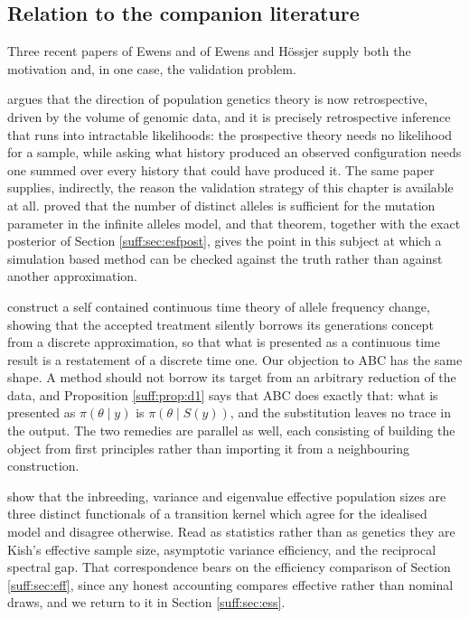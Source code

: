 \subsection{Relation to the companion literature}

Three recent papers of Ewens and of Ewens and H\"ossjer supply both the motivation and, in one
case, the validation problem.

\citet{suff:ewens2024} argues that the direction of population genetics theory is now
retrospective, driven by the volume of genomic data, and it is precisely retrospective
inference that runs into intractable likelihoods: the prospective theory needs no likelihood
for a sample, while asking what history produced an observed configuration needs one summed
over every history that could have produced it. The same paper supplies, indirectly, the
reason the validation strategy of this chapter is available at all. \citet{suff:ewens1972}
proved that the number of distinct alleles is sufficient for the mutation parameter in the
infinite alleles model, and that theorem, together with the exact posterior of Section
\ref{suff:sec:esfpost}, gives the point in this subject at which a simulation based method
can be checked against the truth rather than against another approximation.

\citet{suff:hossjerewens2025} construct a self contained continuous time theory of allele
frequency change, showing that the accepted treatment silently borrows its generations concept
from a discrete approximation, so that what is presented as a continuous time result is a
restatement of a discrete time one. Our objection to ABC has the same shape. A method should
not borrow its target from an arbitrary reduction of the data, and Proposition
\ref{suff:prop:d1} says that ABC does exactly that: what is presented as $\pi(\theta\mid y)$
is $\pi(\theta\mid S(y))$, and the substitution leaves no trace in the output. The two
remedies are parallel as well, each consisting of building the object from first principles
rather than importing it from a neighbouring construction.

\citet{suff:ewenshossjer2025} show that the inbreeding, variance and eigenvalue effective
population sizes are three distinct functionals of a transition kernel which agree for the
idealised model and disagree otherwise. Read as statistics rather than as genetics they are
Kish's effective sample size, asymptotic variance efficiency, and the reciprocal spectral
gap. That correspondence bears on the efficiency comparison of Section \ref{suff:sec:eff},
since any honest accounting compares effective rather than nominal draws, and we return to it
in Section \ref{suff:sec:ess}.


